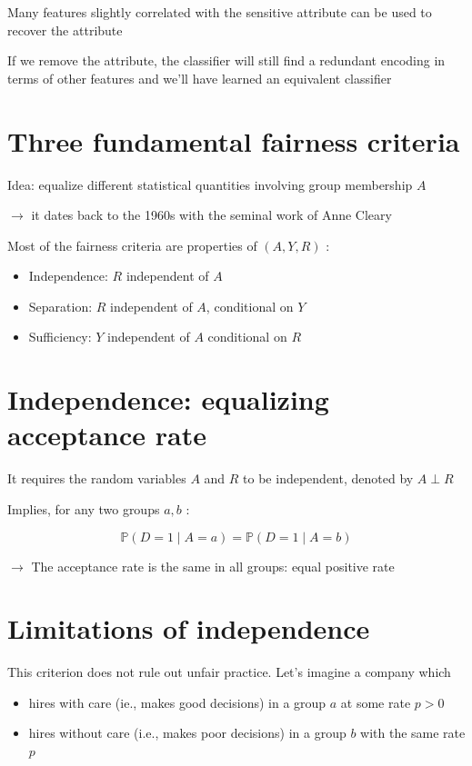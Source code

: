 \documentclass[10pt]{article}
\begin{document}
Many features slightly correlated with the sensitive attribute can be used to recover the attribute

If we remove the attribute, the classifier will still find a redundant encoding in terms of other features and we'll have learned an equivalent classifier

\section*{Three fundamental fairness criteria}
Idea: equalize different statistical quantities involving group membership $A$

$\rightarrow$ it dates back to the 1960s with the seminal work of Anne Cleary

Most of the fairness criteria are properties of $(A, Y, R)$ :

\begin{itemize}
  \item Independence: $R$ independent of $A$
  \item Separation: $R$ independent of $A$, conditional on $Y$
  \item Sufficiency: $Y$ independent of $A$ conditional on $R$
\end{itemize}

\section*{Independence: equalizing acceptance rate}
It requires the random variables $A$ and $R$ to be independent, denoted by $A \perp R$

Implies, for any two groups $a, b$ :

$$
\mathbb{P}(D=1 \mid A=a)=\mathbb{P}(D=1 \mid A=b)
$$

$\rightarrow$ The acceptance rate is the same in all groups: equal positive rate

\section*{Limitations of independence}
This criterion does not rule out unfair practice. Let's imagine a company which

\begin{itemize}
  \item hires with care (ie., makes good decisions) in a group $a$ at some rate $p>0$
  \item hires without care (i.e., makes poor decisions) in a group $b$ with the same rate $p$
\end{itemize}
\end{document}

